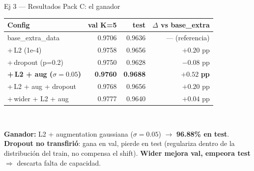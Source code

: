 \documentclass[11pt,aspectratio=169]{beamer}
\begin{document}
\begin{frame}{Ej 3 — Resultados Pack C: el ganador}
\centering\small
\begin{tabular}{@{}lrrr@{}}
\toprule
\textbf{Config} & \textbf{val K=5} & \textbf{test} & \textbf{$\Delta$ vs base\_extra} \\
\midrule
base\_extra\_data            & 0.9706 & 0.9636 & --- (referencia) \\
\quad +\,L2 (1e-4)            & 0.9758 & 0.9656 & $+0.20$ pp \\
\quad +\,dropout (p=0.2)      & 0.9750 & 0.9628 & $-0.08$ pp \\
\rowcolor{accent2!15}
\textbf{\quad +\,L2 + aug ($\sigma=0.05$)} & \textbf{0.9760} & \textbf{0.9688} & \(\boldsymbol{+0.52}\)\textbf{ pp} \\
\quad +\,L2 + aug + dropout   & 0.9768 & 0.9656 & $+0.20$ pp \\
\quad +\,wider + L2 + aug     & 0.9777 & 0.9640 & $+0.04$ pp \\
\bottomrule
\end{tabular}\\[0.6em]

\begin{takeaway}
\textbf{Ganador:} L2 + augmentation gaussiana ($\sigma=0.05$) $\to$ \textbf{96.88\% en test}.\\[0.2em]
\textbf{Dropout no transfirió}: gana en val, pierde en test (regulariza dentro de la distribución del train, no compensa el shift). \textbf{Wider mejora val, empeora test} $\Rightarrow$ descarta falta de capacidad.
\end{takeaway}
\end{frame}
\end{document}
